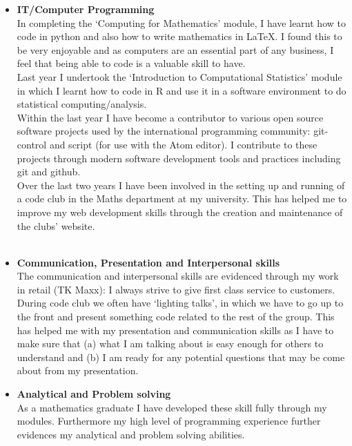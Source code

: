 \documentclass[10pt]{res}
\begin{document}
\begin{resume}
\begin{itemize}
\item \textbf{IT/Computer Programming} \\
In completing the ‘Computing for Mathematics’ module, I have learnt how to code
in python and also how to write mathematics in \LaTeX. I found this to be very
enjoyable and as computers are an essential part of any business, I feel that
being able to code is a valuable skill to have.
\\[4pt]
Last year I undertook the ‘Introduction to Computational Statistics’ module in
which I learnt how to code in R and use it in a software environment to do
statistical computing/analysis.
\\[4pt]
Within the last year I have become a contributor to various open source software
projects used by the international programming community: git-control and script
(for use with the Atom editor). I contribute to these projects through modern
software development tools and practices including git and github.
\\[4pt]
Over the last two years I have been involved in the setting up and running of a
code club in the Maths department at my university. This has helped me to
improve my web development skills through the creation and maintenance of the
clubs' website.
\\ \\
\item \textbf{Communication, Presentation and Interpersonal skills} \\
The communication and interpersonal skills are evidenced through my work in
retail (TK Maxx): I always strive to give first class service to customers.
\\[4pt]
During code club we often have `lighting talks', in which we have to go
up to the front and present something code related to the rest of the group.
This has helped me with my presentation and communication skills as I have to
make sure that (a) what I am talking about is easy enough for others to
understand and (b) I am ready for any potential questions that may be come about
from my presentation.
\\[-10pt]
\item \textbf{Analytical and Problem solving} \\
As a mathematics graduate I have developed these skill fully through my
modules. Furthermore my high level of programming experience further
evidences my analytical and problem solving abilities.
\\[-10pt]

\end{itemize}
\end{resume}
\end{document}
